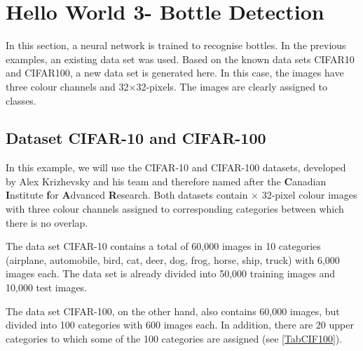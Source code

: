 %
%


\section{\glqq Hello World 3\grqq - Bottle Detection}\label{TrainFlaschen}

In this section, a neural network is trained to recognise bottles. In the previous examples, an existing data set was used. Based on the known data sets CIFAR10 and CIFAR100, a new data set is generated here. In this case, the images have three colour channels and 32$\times$32-pixels. The images are clearly assigned to classes.  


\subsection{Dataset CIFAR-10 and CIFAR-100}

In this example, we will use the CIFAR-10 and CIFAR-100 datasets, developed by Alex Krizhevsky and his team and therefore named after the \textbf{C}anadian \textbf{I}nstitute \textbf{f}or \textbf{A}dvanced \textbf{R}esearch. 
Both datasets contain $\times$ 32-pixel colour images with three colour channels assigned to corresponding categories between which there is no overlap. \cite{Krizhevsky:2009}

The data set CIFAR-10 contains a total of 60,000 images in 10 categories (airplane, automobile, bird, cat, deer, dog, frog, horse, ship, truck) with 6,000 images each. The data set is already divided into 50,000 training images and 10,000 test images.

The data set CIFAR-100, on the other hand, also contains 60,000 images, but divided into 100 categories with 600 images each. In addition, there are 20 upper categories to which some of the 100 categories are assigned (see \ref{TabCIF100}).


